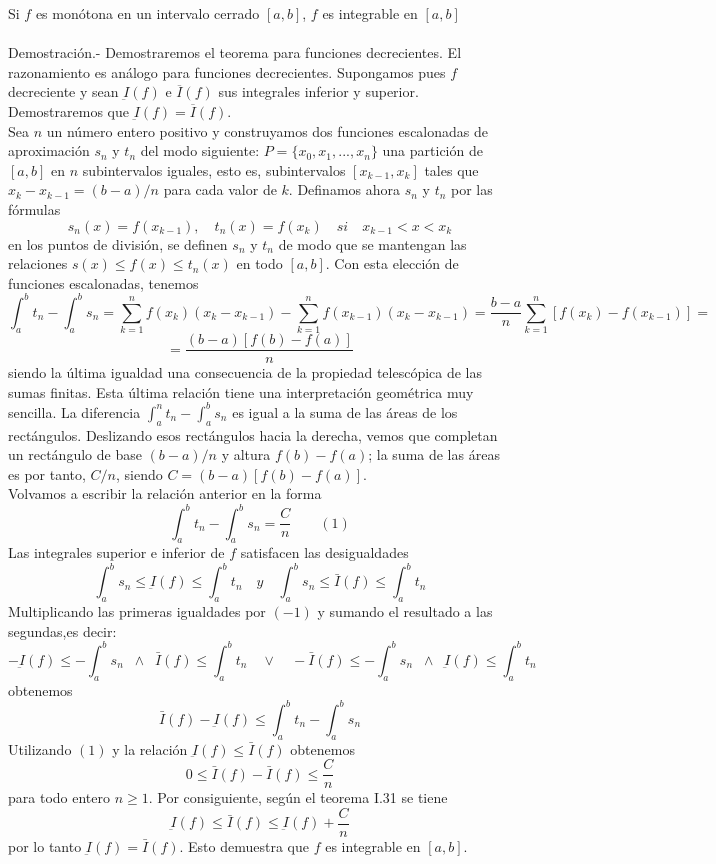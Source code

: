 \begin{teo} Si $f$ es monótona en un intervalo cerrado $[a,b]$, $f$ es integrable en $[a,b]$\\\\
    Demostración.-\; Demostraremos el teorema para funciones decrecientes. El razonamiento es análogo para funciones decrecientes. Supongamos pues $f$ decreciente y sean $\underbar{I}(f)$ e $\overline{I}(f)$ sus integrales inferior y superior. Demostraremos que $\underbar{I}(f)=\overline{I}(f)$. \\
    Sea $n$ un número entero positivo y construyamos dos funciones escalonadas de aproximación $s_n$ y $t_n$ del modo siguiente: $P=\lbrace x_0,x_1,...,x_n \rbrace$ una partición de $[a,b]$ en $n$ subintervalos iguales, esto es, subintervalos $[x_{k-1},x_k]$ tales que $x_k-x_{k-1} = (b-a)/n$ para cada valor de $k$. Definamos ahora $s_n$ y $t_n$ por las fórmulas $$s_n(x)=f(x_{k-1}), \quad t_n(x)=f(x_k) \quad si \quad x_{k-1}<x<x_k$$ en los puntos de división, se definen $s_n$ y $t_n$ de modo que se mantengan las relaciones $s(x)\leq f(x) \leq t_n(x)$ en todo $[a,b]$. Con esta elección de funciones escalonadas, tenemos 
    $$\int_a^b t_n - \int_a^b s_n = \sum\limits_{k=1}^n f(x_k)(x_k-x_{k-1}) - \sum\limits_{k=1}^n f(x_{k-1})(x_k-x_{k-1}) = \dfrac{b-a}{n}\sum\limits_{k=1}^n \left[f(x_{k}) - f(x_{k-1})\right]=$$ $$=\dfrac{(b-a)\left[f(b)-f(a)\right]}{n}$$
    siendo la última igualdad una consecuencia de la propiedad telescópica de las sumas finitas. Esta última relación tiene una interpretación geométrica muy sencilla. La diferencia $\int_a^n t_n - \int_a^b s_n$ es igual a la suma de las áreas de los rectángulos. Deslizando esos rectángulos hacia la derecha, vemos que completan un rectángulo de base $(b-a)/n$ y altura $f(b)-f(a)$; la suma de las áreas es por tanto, $C/n$, siendo $C=(b-a)\left[f(b)-f(a)\right]$.\\
    Volvamos a escribir la relación anterior en la forma $$\int_a^b t_n - \int_a^b s_n = \dfrac{C}{n} \qquad (1)$$
    Las integrales superior e inferior de $f$ satisfacen las desigualdades $$\int_a^b s_n \leq \underbar{I}(f) \leq \int_a^b t_n \quad y \quad \int_a^b s_n \leq \bar{I}(f)\leq \int_a^b t_n$$
    Multiplicando las primeras igualdades por $(-1)$ y sumando el resultado a las segundas,es decir: $$-\underbar{I}(f)\leq - \int_a^b s_n \;\;\land \;\;  \bar{I}(f) \leq \int_a^b t_n \quad \lor \quad -\bar{I}(f)\leq -\int_a^b s_n \;\;\land\;\; \underbar{I}(f)\leq \int_a^b t_n$$ obtenemos $$\bar{I}(f)-\underbar{I}(f) \leq \int_a^b t_n - \int_a^b s_n$$ 
    Utilizando $(1)$ y la relación $\underbar{I}(f) \leq \bar{I}(f)$ obtenemos $$0\leq \bar{I}(f) - \bar{I}(f) \leq \dfrac{C}{n}$$
    para todo entero $n\geq 1$. Por consiguiente, según el teorema I.31 se tiene $$\underbar{I}(f)\leq \bar{I}(f)\leq \underbar{I}(f) + \dfrac{C}{n}$$
    por lo tanto $\underbar{I}(f)=\bar{I}(f)$. Esto demuestra que $f$ es integrable en $[a,b]$.\\\\ 
\end{teo}


